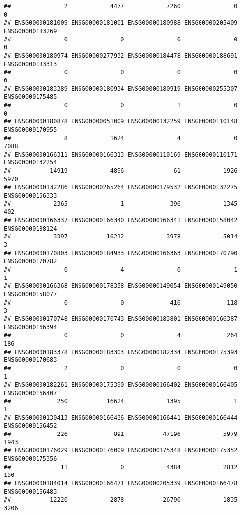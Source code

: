 \documentclass[
]{article}
\begin{document}
\begin{verbatim}
##               2            4477            7260               0               0 
## ENSG00000181009 ENSG00000181001 ENSG00000180988 ENSG00000205409 ENSG00000183269 
##               0               0               0               0               0 
## ENSG00000180974 ENSG00000277932 ENSG00000184478 ENSG00000188691 ENSG00000183313 
##               0               0               0               0               0 
## ENSG00000183389 ENSG00000180934 ENSG00000180919 ENSG00000255307 ENSG00000175485 
##               0               0               1               0               0 
## ENSG00000180878 ENSG00000051009 ENSG00000132259 ENSG00000110148 ENSG00000170955 
##               8            1624               4               0            7088 
## ENSG00000166311 ENSG00000166313 ENSG00000110169 ENSG00000110171 ENSG00000132254 
##           14919            4896              61            1926            5970 
## ENSG00000132286 ENSG00000265264 ENSG00000179532 ENSG00000132275 ENSG00000166333 
##            2365               1             396            1345             402 
## ENSG00000166337 ENSG00000166340 ENSG00000166341 ENSG00000158042 ENSG00000188124 
##            3397           16212            3978            5014               3 
## ENSG00000170803 ENSG00000184933 ENSG00000166363 ENSG00000170790 ENSG00000170782 
##               0               4               0               1               1 
## ENSG00000166368 ENSG00000178358 ENSG00000149054 ENSG00000149050 ENSG00000158077 
##               0               0             416             118               3 
## ENSG00000170748 ENSG00000170743 ENSG00000183801 ENSG00000166387 ENSG00000166394 
##               0               0               4             264             186 
## ENSG00000183378 ENSG00000183303 ENSG00000182334 ENSG00000175393 ENSG00000170683 
##               2               0               0               0               1 
## ENSG00000182261 ENSG00000175390 ENSG00000166402 ENSG00000166405 ENSG00000166407 
##             250           16624            1395               1               1 
## ENSG00000130413 ENSG00000166436 ENSG00000166441 ENSG00000166444 ENSG00000166452 
##             226             891           47196            5979            1943 
## ENSG00000176029 ENSG00000176009 ENSG00000175348 ENSG00000175352 ENSG00000175356 
##              11               0            4384            2812             150 
## ENSG00000184014 ENSG00000166471 ENSG00000205339 ENSG00000166478 ENSG00000166483 
##           12220            2878           26790            1835            3206 

\end{verbatim}
\end{document}
